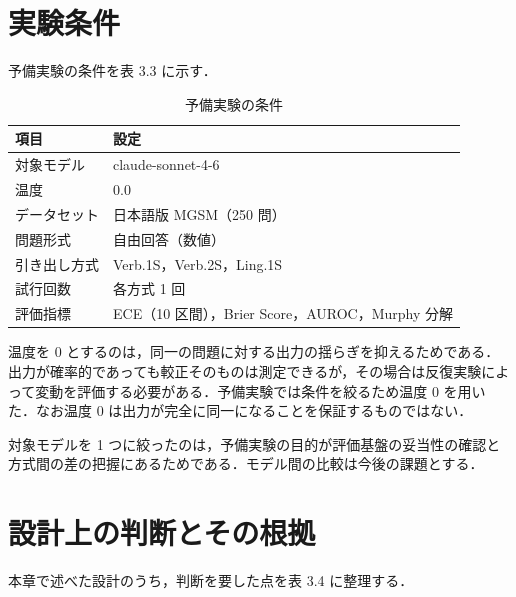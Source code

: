 \section{実験条件}

予備実験の条件を表 3.3 に示す．

\begin{table}[htbp]
\centering
\small
\caption{予備実験の条件}
\label{tab:3.3}
\begin{tabularx}{\linewidth}{|l|X|}
\hline
項目 & 設定 \\
\hline
対象モデル & claude-sonnet-4-6 \\
温度 & 0.0 \\
データセット & 日本語版 MGSM（250 問） \\
問題形式 & 自由回答（数値） \\
引き出し方式 & Verb.1S，Verb.2S，Ling.1S \\
試行回数 & 各方式 1 回 \\
評価指標 & ECE（10 区間），Brier Score，AUROC，Murphy 分解 \\
\hline
\end{tabularx}
\end{table}

温度を 0 とするのは，同一の問題に対する出力の揺らぎを抑えるためである．出力が確率的であっても較正そのものは測定できるが，その場合は反復実験によって変動を評価する必要がある．予備実験では条件を絞るため温度 0 を用いた．なお温度 0 は出力が完全に同一になることを保証するものではない．

対象モデルを 1 つに絞ったのは，予備実験の目的が評価基盤の妥当性の確認と方式間の差の把握にあるためである．モデル間の比較は今後の課題とする．

\section{設計上の判断とその根拠}

本章で述べた設計のうち，判断を要した点を表 3.4 に整理する．

